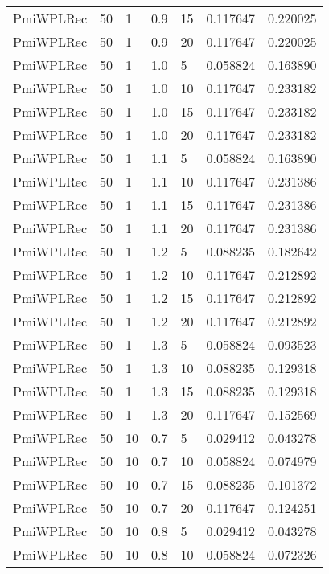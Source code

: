 \begin{tabular}{lllrlrr}
 PmiWPLRec &   50 &     1 &   0.9 &   15 &     0.117647 &  0.220025 \\
 PmiWPLRec &   50 &     1 &   0.9 &   20 &     0.117647 &  0.220025 \\
 PmiWPLRec &   50 &     1 &   1.0 &    5 &     0.058824 &  0.163890 \\
 PmiWPLRec &   50 &     1 &   1.0 &   10 &     0.117647 &  0.233182 \\
 PmiWPLRec &   50 &     1 &   1.0 &   15 &     0.117647 &  0.233182 \\
 PmiWPLRec &   50 &     1 &   1.0 &   20 &     0.117647 &  0.233182 \\
 PmiWPLRec &   50 &     1 &   1.1 &    5 &     0.058824 &  0.163890 \\
 PmiWPLRec &   50 &     1 &   1.1 &   10 &     0.117647 &  0.231386 \\
 PmiWPLRec &   50 &     1 &   1.1 &   15 &     0.117647 &  0.231386 \\
 PmiWPLRec &   50 &     1 &   1.1 &   20 &     0.117647 &  0.231386 \\
 PmiWPLRec &   50 &     1 &   1.2 &    5 &     0.088235 &  0.182642 \\
 PmiWPLRec &   50 &     1 &   1.2 &   10 &     0.117647 &  0.212892 \\
 PmiWPLRec &   50 &     1 &   1.2 &   15 &     0.117647 &  0.212892 \\
 PmiWPLRec &   50 &     1 &   1.2 &   20 &     0.117647 &  0.212892 \\
 PmiWPLRec &   50 &     1 &   1.3 &    5 &     0.058824 &  0.093523 \\
 PmiWPLRec &   50 &     1 &   1.3 &   10 &     0.088235 &  0.129318 \\
 PmiWPLRec &   50 &     1 &   1.3 &   15 &     0.088235 &  0.129318 \\
 PmiWPLRec &   50 &     1 &   1.3 &   20 &     0.117647 &  0.152569 \\
 PmiWPLRec &   50 &    10 &   0.7 &    5 &     0.029412 &  0.043278 \\
 PmiWPLRec &   50 &    10 &   0.7 &   10 &     0.058824 &  0.074979 \\
 PmiWPLRec &   50 &    10 &   0.7 &   15 &     0.088235 &  0.101372 \\
 PmiWPLRec &   50 &    10 &   0.7 &   20 &     0.117647 &  0.124251 \\
 PmiWPLRec &   50 &    10 &   0.8 &    5 &     0.029412 &  0.043278 \\
 PmiWPLRec &   50 &    10 &   0.8 &   10 &     0.058824 &  0.072326 \\

\end{tabular}

